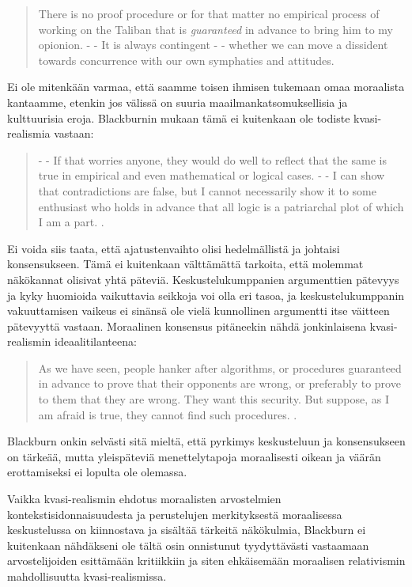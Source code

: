 \documentclass[a4paper,12pt,times,titlepage,finnish]{article}
\begin{document}
\begin{quote}
	There is no proof procedure or for that matter no empirical process of working on the Taliban that is {\it guaranteed} in advance to bring him to my opionion. - - It is always contingent - - whether we can move a dissident towards concurrence with our own symphaties and attitudes. 
\end{quote}

Ei ole mitenkään varmaa, että saamme toisen ihmisen tukemaan omaa moraalista kantaamme, etenkin jos välissä on suuria maailmankatsomuksellisia ja kulttuurisia eroja. Blackburnin mukaan tämä ei kuitenkaan ole todiste kvasi-realismia vastaan:


\begin{quote}
- - If that worries anyone, they would do well to reflect that the same is true in empirical and even mathematical or logical cases. - - I can show that contradictions are false, but I cannot necessarily show it to some enthusiast who holds in advance that all logic is a patriarchal plot of which I am a part. \citep[216]{Blackburn99}.
\end{quote}

Ei voida siis taata, että ajatustenvaihto olisi hedelmällistä ja johtaisi konsensukseen. Tä\-mä ei kuitenkaan välttämättä tarkoita, että molemmat näkökannat olisivat yhtä päteviä. Keskustelukumppanien argumenttien pätevyys ja kyky huomioida vaikuttavia seikkoja voi olla eri tasoa, ja keskustelukumppanin vakuuttamisen vaikeus ei sinänsä ole vielä kunnollinen argumentti itse väitteen pätevyyttä vastaan. Moraalinen konsensus pitäneekin nähdä jonkinlaisena kvasi-\-realismin ideaalitilanteena:

\begin{quote}
	As we have seen, people hanker after algorithms, or procedures guaranteed in advance to prove that their opponents are wrong, or preferably to prove to them that they are wrong. They want this security. But suppose, as I am afraid is true, they cannot find such procedures. \citep[225]{Blackburn99}.
\end{quote}

Blackburn onkin selvästi sitä mieltä, että pyrkimys keskusteluun ja konsensukseen on tärkeää, mutta yleispäteviä menettelytapoja moraalisesti oikean ja väärän erottamiseksi ei lopulta ole olemassa. 

Vaikka kvasi-\-realismin ehdotus moraalisten arvostelmien konteksti\-sidon\-nai\-suu\-des\-ta ja perustelujen merkityksestä moraalisessa keskustelussa on kiinnostava ja sisäl\-tää tärkeitä näkökulmia, Blackburn ei kuitenkaan nähdäkseni ole tältä osin onnistunut tyydyttävästi vastaamaan arvostelijoiden esittämään kritiikkiin ja siten eh\-käi\-se\-mään moraalisen relativismin mahdollisuutta kvasi-\-realismissa. 
\end{document}
